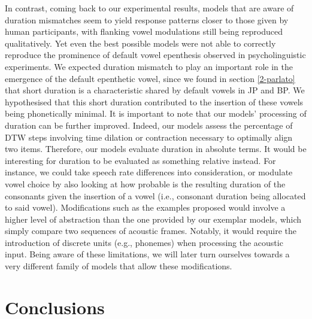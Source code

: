 In contrast, coming back to our experimental results, models that are aware of duration mismatches seem to yield response patterns closer to those given by human participants, with flanking vowel modulations still being reproduced qualitatively. Yet even the best possible models were not able to correctly reproduce the prominence of default vowel epenthesis observed in psycholinguistic experiments. We expected duration mismatch to play an important role in the emergence of the default epenthetic vowel, since we found in section \ref{2-parlato} that short duration is a characteristic shared by default vowels in JP and BP. We hypothesised that this short duration contributed to the insertion of these vowels being phonetically minimal.
It is important to note that our models' processing of duration can be further improved. Indeed, our models assess the percentage of DTW steps involving time dilation or contraction necessary to optimally align two items. Therefore, our models evaluate duration in absolute terms. It would be interesting for duration to be evaluated as something relative instead. For instance, we could take speech rate differences into consideration, or modulate vowel choice by also looking at how probable is the resulting duration of the consonants given the insertion of a vowel (i.e., consonant duration being allocated to said vowel). Modifications such as the examples proposed would involve a higher level of abstraction than the one provided by our exemplar models, which simply compare two sequences of acoustic frames. Notably, it would require the introduction of discrete units (e.g., phonemes) when processing the acoustic input. Being aware of these limitations, we will later turn ourselves towards a very different family of models that allow these modifications.


\section{Conclusions}


